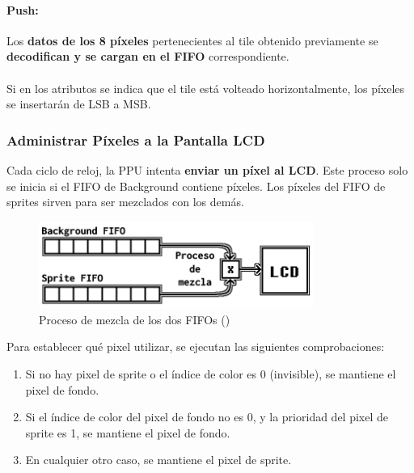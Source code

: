 \paragraph{Push:} Los \textbf{datos de los 8 píxeles} pertenecientes al tile obtenido previamente se \textbf{decodifican y se cargan en el FIFO} correspondiente.
\\\\
Si en los atributos se indica que el tile está volteado horizontalmente, los píxeles se insertarán de LSB a MSB.

\subsubsection{Administrar Píxeles a la Pantalla LCD}

Cada ciclo de reloj, la PPU intenta \textbf{enviar un píxel al LCD}. Este proceso solo se inicia si el FIFO de Background contiene píxeles. Los píxeles del FIFO de sprites sirven para ser mezclados con los demás.

\begin{figure}[H]
    \centering
    \includegraphics[width=0.8\textwidth]{include/images/fifo_mixer.png}
    \caption{Proceso de mezcla de los dos FIFOs (\cite{gbedg})}
    \label{figure:fifo_mixer}
\end{figure}

Para establecer qué pixel utilizar, se ejecutan las siguientes comprobaciones:

\begin{enumerate}
    \item Si no hay pixel de sprite o el índice de color es 0 (invisible), se mantiene el pixel de fondo.
    \item Si el índice de color del pixel de fondo no es 0, y la prioridad del pixel de sprite es 1, se mantiene el pixel de fondo.
    \item En cualquier otro caso, se mantiene el pixel de sprite.
\end{enumerate}

\cleardoublepage
